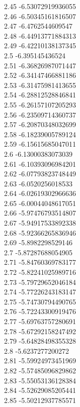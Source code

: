{2.45	-6.53072919936055\\
2.46	-6.50345161816507\\
2.47	-6.4762544609547\\
2.48	-6.44913771884313\\
2.49	-6.42210138137345\\
2.5	-6.395145436524\\
2.51	-6.36826987071447\\
2.52	-6.34147466881186\\
2.53	-6.31475981413655\\
2.54	-6.28812528846841\\
2.55	-6.26157107205293\\
2.56	-6.23509714360737\\
2.57	-6.20870348032699\\
2.58	-6.18239005789124\\
2.59	-6.15615685047011\\
2.6	-6.13000383073039\\
2.61	-6.10393096984201\\
2.62	-6.07793823748449\\
2.63	-6.0520256018533\\
2.64	-6.02619302966636\\
2.65	-6.00044048617051\\
2.66	-5.97476793514807\\
2.67	-5.94917533892338\\
2.68	-5.92366265836946\\
2.69	-5.8982298529146\\
2.7	-5.87287688054905\\
2.71	-5.84760369783177\\
2.72	-5.82241025989716\\
2.73	-5.79729652046184\\
2.74	-5.77226243183147\\
2.75	-5.74730794490765\\
2.76	-5.72243300919476\\
2.77	-5.69763757280691\\
2.78	-5.67292158247492\\
2.79	-5.64828498355328\\
2.8	-5.6237277200272\\
2.81	-5.59924973451969\\
2.82	-5.57485096829862\\
2.83	-5.55053136128384\\
2.84	-5.52629085205441\\
2.85	-5.50212937785571\\
}
